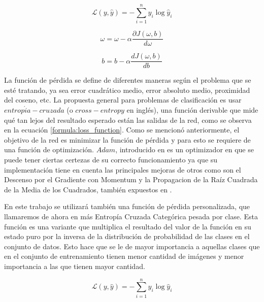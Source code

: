  \begin{equation}\label{formula:loss_function}
 \mathcal{L}(y, \hat{y})=-\sum_{i=1}^{n} y_{i} \log \hat{y}_{i}
 \end{equation}
 
 \begin{equation}\label{formula:parcial_derivate_w}
 \omega =\omega-\alpha \frac{\partial J(\omega, b)}{d \omega}
 \end{equation}
 
 \begin{equation}\label{formula:parcial_derivate_b}
 b=b-\alpha \frac{d J(\omega, b)}{d b}
 \end{equation}
 
  La función de pérdida se define de diferentes maneras según el problema que se esté tratando, ya sea error cuadrático medio, error absoluto medio, proximidad del coseno, etc. La propuesta general para problemas de clasificación es usar \(entrop{\acute i}a-cruzada\) (o \(cross-entropy\) en inglés), una función derivable que mide qué tan lejos del resultado esperado están las salidas de la red, como se observa en la ecuación \ref{formula:loss_function}. Como se mencionó anteriormente, el objetivo de la red es minimizar la función de pérdida y para esto se requiere de una función de optimización. \(Adam\), introducido en \cite{kingma2014adam} es un optimizador en que se puede tener ciertas certezas de su correcto funcionamiento ya que su implementación tiene en cuenta las principales mejoras de otros como son el Descenso por el Gradiente con Momentum y la Propagacion de la Raíz Cuadrada de la Media de los Cuadrados, también expuestos en \cite{choi2019empirical}.
  
  En este trabajo se utilizará también una función de pérdida personalizada, que llamaremos de ahora en más Entropía Cruzada Categórica pesada por clase. Esta función es una variante que multiplica el resultado del valor de la función en su estado puro por la inversa de la distribución de probabilidad de las clases en el conjunto de datos. Esto hace que se le de mayor importancia a aquellas clases que en el conjunto de entrenamiento tienen menor cantidad de imágenes y menor importancia a las que tienen mayor cantidad.
  
  \begin{equation}\label{formula:custom_loss_function}
  \mathcal{L}(y, \hat{y})=-\sum_{i=1}^{n} y_{i} \log \hat{y}_{i}
  \end{equation}
  
